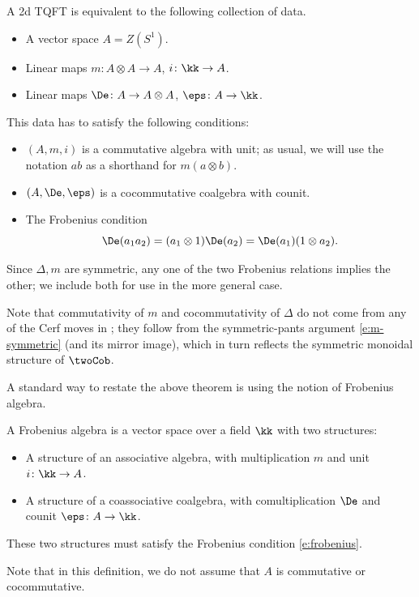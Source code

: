 \begin{theorem}\label{t:2d-classification}
  A 2d TQFT is equivalent to the following collection of data.
  \begin{itemize}
    \item A vector space $A=Z(S^1)$.
    \item Linear maps $m\colon A\otimes A\to A$, $i\colon \kk\to A$.
    \item Linear maps $\De\colon A\to A\otimes A$, $\eps\colon A\to \kk$.
  \end{itemize}
  This data has to satisfy the following conditions:
  \begin{itemize}
    \item $(A,m, i)$ is a commutative algebra with unit; as usual, we will use
      the notation $ab$ as a shorthand for $m(a\otimes b)$.
    \item $(A,\De, \eps)$ is a cocommutative coalgebra with counit.
    \item The Frobenius condition
      \begin{equation}\label{e:frobenius}
        \De(a_1 a_2) = (a_1\otimes 1) \De(a_2)= \De(a_1)(1\otimes a_2).
      \end{equation}
  \end{itemize}
\end{theorem}

\begin{remark}\label{r:frobenius-two}
  Since $\Delta, m$ are symmetric, any one of the two Frobenius relations
  implies the other; we include both for use in the more general case.
\end{remark}


\begin{remark}\label{r:2d-commutative}
  Note that commutativity of $m$ and cocommutativity of $\Delta$ do not come
  from any of the Cerf moves in ; they follow from the
  symmetric-pants argument \eqref{e:m-symmetric} (and its mirror image), which
  in turn reflects the symmetric monoidal structure of $\twoCob$.
\end{remark}


A standard way to restate the above theorem is using the notion of Frobenius
algebra.
\begin{definition}\label{d:frobenius}
  A Frobenius algebra is a vector space over a field $\kk$ with two structures:
  \begin{itemize}
    \item A structure of an associative algebra, with multiplication $m$ and
      unit $i\colon \kk \to A$.
    \item A structure of a coassociative coalgebra, with comultiplication $\De$
      and counit $\eps\colon A\to \kk$.
  \end{itemize}
  These two structures must satisfy the Frobenius condition \eqref{e:frobenius}.
\end{definition}
Note that in this definition, we do not assume that $A$ is commutative or
cocommutative.

